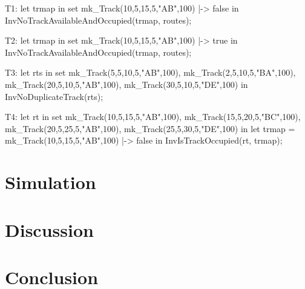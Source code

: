 \documentclass[preprint,12pt]{elsarticle}
\begin{document}
\begin{vdmsl}[label=lst:itlcomb1,caption={Four combinatorial tests that exercise our invariant functions in the Interlocking class.}]
	T1: let trmap in set
	 {{mk_Track(10,5,15,5,"AB",100) |-> false}} in
	InvNoTrackAvailableAndOccupied(trmap, routes);
	
	T2: let trmap in set
	 {{mk_Track(10,5,15,5,"AB",100) |-> true}} in
	InvNoTrackAvailableAndOccupied(trmap, routes);
	
	T3: let rts in set {{{mk_Track(5,5,10,5,"AB",100),
		mk_Track(2,5,10,5,"BA",100)},
		{mk_Track(20,5,10,5,"AB",100),
		mk_Track(30,5,10,5,"DE",100)}}} in
			InvNoDuplicateTrack(rts);
	
	T4: let rt in set {{mk_Track(10,5,15,5,"AB",100),
			mk_Track(15,5,20,5,"BC",100)},
			{mk_Track(20,5,25,5,"AB",100),
			 mk_Track(25,5,30,5,"DE",100)}} in
	let trmap = {mk_Track(10,5,15,5,"AB",100) |-> false} in
	InvIsTrackOccupied(rt, trmap);
\end{vdmsl}

\section{Simulation}

\section{Discussion}

\section{Conclusion}













\end{document}
